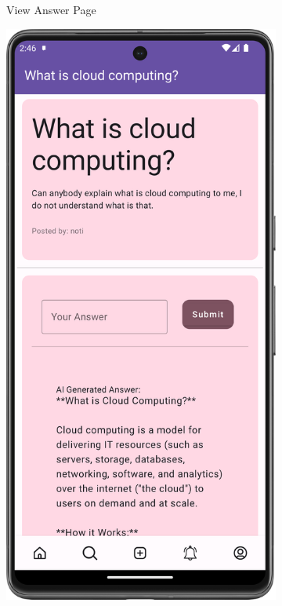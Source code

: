 \begin{figure}[H]
\begin{subfigure}[b]{0.3\textwidth}
    \caption{View Answer Page}
    \label{fig:view_answer}
  \end{subfigure}
  \hfill
  \begin{subfigure}[b]{0.3\textwidth}
    \includegraphics[width=\textwidth]{Figures/Product_Images/Questions_Answers/ai_answer.png}

\end{subfigure}
\end{figure}

